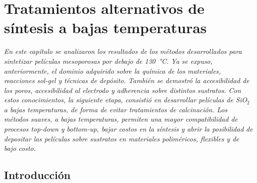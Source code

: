  \newcommand{\NoBiblioBT}[1]{
 \ifthenelse{\equal{#1}{verdadero}}{}{}
 \NoBiblioBT{verdadero}}
 

 \FormatoCapituloDosLineas
 
 \chapter{Tratamientos alternativos de síntesis a bajas temperaturas}
 \label{chap:Optimizacion}

 \thispagestyle{empty}
	
 \noindent\textit{En este capítulo se analizaron los resultados de los métodos desarrollados para sintetizar películas mesoporosas por debajo de \SI{130}{\celsius}. Ya se expuso, anteriormente, el dominio adquirido sobre la química de los materiales, reacciones sol-gel y técnicas de depósito. También se demostró la accesibilidad de los poros, accesibilidad al electrodo y adherencia sobre distintos sustratos. Con estos conocimientos, la siguiente etapa, consistió en desarrollar películas de SiO$_2$ a bajas temperaturas, de forma de evitar tratamientos de calcinación. Los métodos suaves, a bajas temperaturas, permiten una mayor compatibilidad de procesos\textit{ top-down} y\textit{ bottom-up}, bajar costos en la síntesis y abrir la posibilidad de depositar las películas sobre sustratos en materiales poliméricos, flexibles y de bajo costo.}
 
 \vfill
 \minitoc
 \newpage

\section{Introducción}

